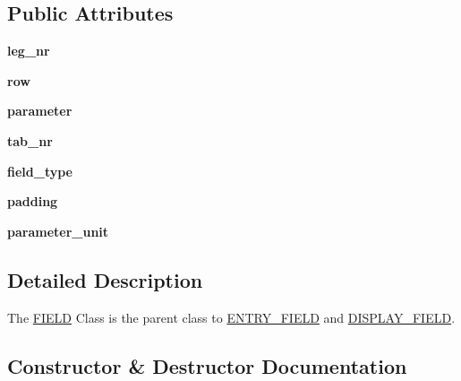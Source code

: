 \subsection*{Public Attributes}
\begin{DoxyCompactItemize}
\item 
\mbox{\label{classfield_1_1FIELD_a58ba464aba1e6a9f0083a7219e7c2fe7}} 
{\bfseries leg\+\_\+nr}
\item 
\mbox{\label{classfield_1_1FIELD_a50ac2059ce466caa6e0e8e52c580d7e4}} 
{\bfseries row}
\item 
\mbox{\label{classfield_1_1FIELD_ab03ad187f5b2ee1d408871e729d5c233}} 
{\bfseries parameter}
\item 
\mbox{\label{classfield_1_1FIELD_a7423afa050f15e240e70a692ba93e0cb}} 
{\bfseries tab\+\_\+nr}
\item 
\mbox{\label{classfield_1_1FIELD_a58a640d2782045a98b18d531e633f0ab}} 
{\bfseries field\+\_\+type}
\item 
\mbox{\label{classfield_1_1FIELD_a140080174fbd572c0ec9ef0379265875}} 
{\bfseries padding}
\item 
\mbox{\label{classfield_1_1FIELD_a0cf194239d7c5a8acf89c2a53dcdf0e7}} 
{\bfseries parameter\+\_\+unit}
\end{DoxyCompactItemize}


\subsection{Detailed Description}
The \hyperlink{classfield_1_1FIELD}{F\+I\+E\+LD} Class is the parent class to \hyperlink{classfield_1_1ENTRY__FIELD}{E\+N\+T\+R\+Y\+\_\+\+F\+I\+E\+LD} and \hyperlink{classfield_1_1DISPLAY__FIELD}{D\+I\+S\+P\+L\+A\+Y\+\_\+\+F\+I\+E\+LD}. 

\subsection{Constructor \& Destructor Documentation}
\mbox{\label{classfield_1_1FIELD_ab7abb063e678d80e62141febc7e1016c}} 

